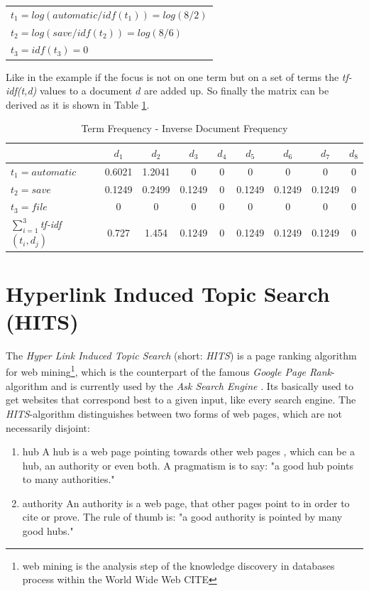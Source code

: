 \begin{table}[h]
  \centering
  \begin{tabular}{l}
    $t_1 = log(automatic / idf(t_1)) = log(8/2)$  \\
    $t_2 = log(save / idf(t_2))=log(8/6)$ \\
    $t_3 = idf(t_3)=0$ 
 \end{tabular}
\end{table}

Like in the example if the focus is not on one term but on a set of terms the \emph{tf-idf(t,d)} values to a document $d$ are added up. So finally the matrix can be derived as it is shown in Table \ref{table:tfidf_table}.

\begin{table}[h]
  \centering
  \begin{tabular}{| l | c | c | c | c | c | c | c | c |}
    \hline
    & $d_1$ & $d_2$ & $d_3$ & $d_4$ & $d_5$ & $d_6$ & $d_7$ & $d_8$ \\ \hline
    $t_1 = automatic$ & 0.6021 & 1.2041 & 0 & 0 & 0 & 0 & 0 & 0 \\ \hline
    $t_2 = save$ & 0.1249 & 0.2499 & 0.1249 &0 & 0.1249 & 0.1249 & 0.1249 & 0 \\ \hline
    $t_3 = file $ & 0 & 0 & 0 & 0 & 0 & 0 & 0 & 0 \\ \hline \hline
    $\sum\nolimits_{i=1}^3$\emph{tf-idf}$(t_i,d_j)$ & 0.727 & 1.454 & 0.1249 & 0 & 0.1249 & 0.1249 & 0.1249 & 0\\ \hline
  \end{tabular}
  \caption{Term Frequency - Inverse Document Frequency}
  \label{table:tfidf_table}
\end{table}

\section{Hyperlink Induced Topic Search (HITS)}
\label{sec:HITS}
The \emph{Hyper Link Induced Topic Search} (short: \emph{HITS}) is a page ranking algorithm for web mining\footnote{web mining is the analysis step of the knowledge discovery in databases process within the World Wide Web CITE}, which is the counterpart of the famous \emph{Google Page Rank}-algorithm and is currently used by the \emph{Ask Search Engine} \cite{wiki:HITS}. Its basically used to get websites that correspond best to a given input, like every search engine. 
The \emph{HITS}-algorithm distinguishes between two forms of web pages, which are not necessarily disjoint:
\begin{enumerate}
  \item hub \newline
  A hub is a web page pointing towards other web pages , which can be a hub, an authority or even both. A pragmatism is to say: "a good hub points to many authorities."
  \item authority \newline
  An authority is a web page, that other pages point to in order to cite or prove. The rule of thumb is: "a good authority is pointed by many good hubs."
\end{enumerate}

